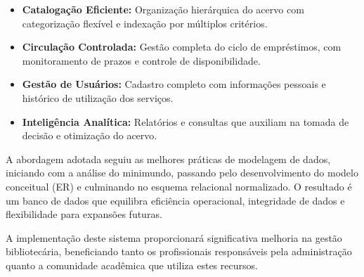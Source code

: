 \documentclass[12pt,a4paper]{article}
\begin{document}
\begin{infobox}
\begin{itemize}
    \item \textbf{Catalogação Eficiente:} Organização hierárquica do acervo com categorização flexível e indexação por múltiplos critérios.
    
    \item \textbf{Circulação Controlada:} Gestão completa do ciclo de empréstimos, com monitoramento de prazos e controle de disponibilidade.
    
    \item \textbf{Gestão de Usuários:} Cadastro completo com informações pessoais e histórico de utilização dos serviços.
    
    \item \textbf{Inteligência Analítica:} Relatórios e consultas que auxiliam na tomada de decisão e otimização do acervo.
\end{itemize}
\end{infobox}

A abordagem adotada seguiu as melhores práticas de modelagem de dados, iniciando com a análise do minimundo, passando pelo desenvolvimento do modelo conceitual (ER) e culminando no esquema relacional normalizado. O resultado é um banco de dados que equilibra eficiência operacional, integridade de dados e flexibilidade para expansões futuras.

A implementação deste sistema proporcionará significativa melhoria na gestão bibliotecária, beneficiando tanto os profissionais responsáveis pela administração quanto a comunidade acadêmica que utiliza estes recursos.
\end{document}

